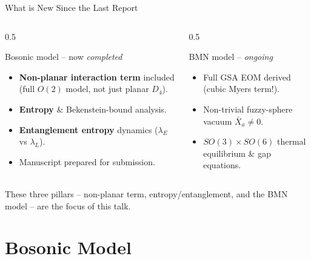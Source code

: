 \documentclass{beamer}
\newcommand{\new}[1]{{\color{metuaccent}\textbf{#1}}}
\begin{document}
\begin{frame}{What is New Since the Last Report}
  \begin{columns}[T]
    \begin{column}{0.5\textwidth}
      \begin{block}{Bosonic model -- now \emph{completed}}
        \begin{itemize}
          \item \new{Non-planar interaction term} included (full $O(2)$ model, not just planar $D_4$).
          \item \new{Entropy} \& Bekenstein-bound analysis.
          \item \new{Entanglement entropy} dynamics ($\lambda_E$ vs $\lambda_L$).
          \item Manuscript prepared for submission.
        \end{itemize}
      \end{block}
    \end{column}
    \begin{column}{0.5\textwidth}
      \begin{block}{BMN model -- \emph{ongoing}}
        \begin{itemize}
          \item Full GSA EOM derived (cubic Myers term!).
          \item Non-trivial fuzzy-sphere vacuum $\bar X_a\neq 0$.
          \item $SO(3)\times SO(6)$ thermal equilibrium \& gap equations.
        \end{itemize}
      \end{block}
    \end{column}
  \end{columns}
  \vspace{0.5em}
  \begin{center}
    \footnotesize\color{metugray}
    These three pillars -- non-planar term, entropy/entanglement, and the BMN model -- are the focus of this talk.
  \end{center}
\end{frame}

\section{Bosonic Model}
\end{document}
